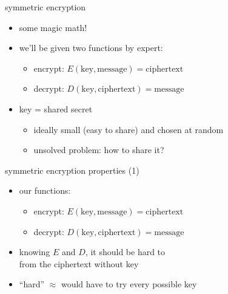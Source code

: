 \begin{frame}{symmetric encryption}
    \begin{itemize}
    \item some magic math!
    \vspace{.5cm}
    \item we'll be given two functions by expert:
        \begin{itemize}
        \item encrypt: $E(\text{key}, \text{message}) = \text{ciphertext}$
        \item decrypt: $D(\text{key}, \text{ciphertext}) = \text{message}$
        \end{itemize}
    \item key = shared secret
        \begin{itemize}
        \item ideally small (easy to share) and chosen at random
        \item unsolved problem: how to share it?
        \end{itemize}
    \end{itemize}
\end{frame}

\begin{frame}{symmetric encryption properties (1)}
    \begin{itemize}
    \item our functions:
        \begin{itemize}
        \item encrypt: $E(\text{key}, \text{message}) = \text{ciphertext}$
        \item decrypt: $D(\text{key}, \text{ciphertext}) = \text{message}$
        \end{itemize}
    \item knowing $E$ and $D$, it should be hard to \\
          from the ciphertext without key
    \item ``hard'' $\approx$ would have to try every possible key
    \end{itemize}
\end{frame}
